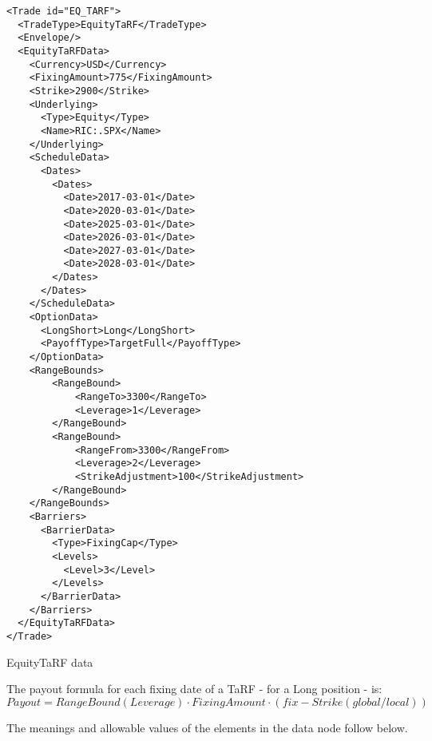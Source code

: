 \begin{listing}[H]
\begin{verbatim}
<Trade id="EQ_TARF">
  <TradeType>EquityTaRF</TradeType>
  <Envelope/>
  <EquityTaRFData>
    <Currency>USD</Currency>
    <FixingAmount>775</FixingAmount>
    <Strike>2900</Strike>
    <Underlying>
      <Type>Equity</Type>
      <Name>RIC:.SPX</Name>
    </Underlying>
    <ScheduleData>
      <Dates>
        <Dates>
          <Date>2017-03-01</Date>
          <Date>2020-03-01</Date>
          <Date>2025-03-01</Date>
          <Date>2026-03-01</Date> 
          <Date>2027-03-01</Date>                   
          <Date>2028-03-01</Date>
        </Dates>
      </Dates>
    </ScheduleData>
    <OptionData>
      <LongShort>Long</LongShort>
      <PayoffType>TargetFull</PayoffType>
    </OptionData>
    <RangeBounds>
        <RangeBound>
            <RangeTo>3300</RangeTo>
            <Leverage>1</Leverage>
        </RangeBound>
        <RangeBound>
            <RangeFrom>3300</RangeFrom>
            <Leverage>2</Leverage>
            <StrikeAdjustment>100</StrikeAdjustment>
        </RangeBound>
    </RangeBounds>
    <Barriers>
      <BarrierData>
        <Type>FixingCap</Type>
        <Levels>
          <Level>3</Level>
        </Levels>
      </BarrierData>
    </Barriers>
  </EquityTaRFData>
</Trade>
\end{verbatim}
\caption{EquityTaRF data}
\label{lst:eqtarf_data}
\end{listing}

The payout formula for each fixing date of a TaRF - for a Long position - is:
$
Payout = RangeBound(Leverage) \cdot FixingAmount \cdot (fix - Strike(global/local))
$


The meanings and allowable values of the elements in the data  node follow below.

